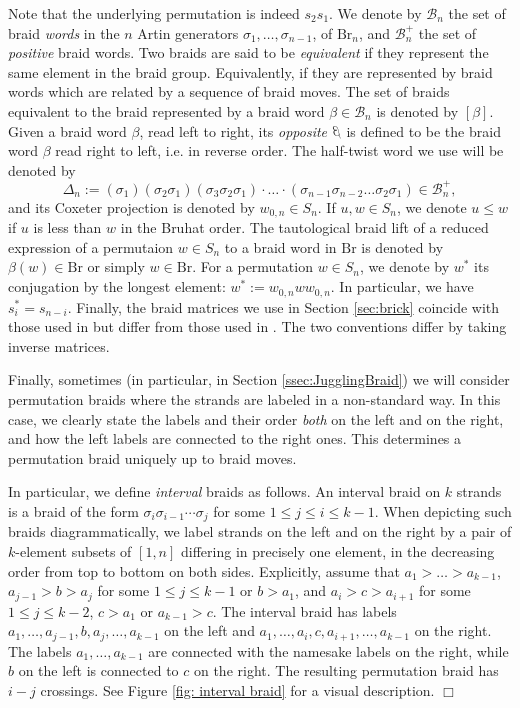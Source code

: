 \documentclass[10pt]{amsart}
\theoremstyle{plain}
\theoremstyle{definition}
\theoremstyle{remark}
\numberwithin{equation}{section}
\newcommand{\cB}{\mathcal{B}}
\newcommand{\Br}{\mathrm{Br}}
\DeclareRobustCommand{\ateb}{\text{\reflectbox{$\beta$}}}
\begin{document}
\noindent Note that the underlying permutation is indeed $s_2s_1$. We denote by $\cB_n$ the set of braid {\it words} in the $n$ Artin generators $\sigma_1,\ldots,\sigma_{n-1}$, of $\Br_n$, and $\cB^+_n$ the set of {\it positive} braid words. Two braids are said to be \emph{equivalent} if they represent the same element in the braid group. Equivalently, if they are represented by braid words which are related by a sequence of braid moves. The set of braids equivalent to the braid represented by a braid word $\beta\in\cB_n$ is denoted by $[\beta]$. Given a braid word $\beta$, read left to right, its {\it opposite} $\ateb$ is defined to be the braid word $\beta$ read right to left, i.e. in reverse order. The half-twist word we use will be denoted by
$$\Delta_n:=(\sigma_1)(\sigma_2\sigma_1)(\sigma_3\sigma_2\sigma_1)\cdot\ldots\cdot(\sigma_{n-1}\sigma_{n-2}\ldots\sigma_2\sigma_1)\in\cB^+_n,$$
and its Coxeter projection is denoted by $w_{0,n}\in S_n$. If $u,w\in S_n$, we denote $u\leq w$ if $u$ is less than $w$ in the Bruhat order. The tautological braid lift of a reduced expression of a permutaion $w\in S_n$ to a braid word in $\Br$ is denoted by $\beta(w)\in \Br$ or simply $w\in \Br$. 
For a permutation $w \in S_n$, we denote by $w^*$ its conjugation by the longest element: $w^* := w_{0, n} w w_{0, n}$. In particular, we have $s_i^* = s_{n-i}$.
Finally, the braid matrices we use in Section \ref{sec:brick} coincide with those used in \cite{CGGS, CasalsNg} but differ from those used in \cite{cgglss}. The two conventions differ by taking inverse matrices. 

Finally, sometimes (in particular, in Section \ref{ssec:JugglingBraid}) we will consider  permutation braids where the strands are labeled in a non-standard way. In this case, we clearly state the labels and their order {\it both} on the left and on the right, and how the left labels are connected to the right ones. This determines a permutation braid uniquely up to braid moves. 

In particular, we define {\it interval} braids as follows.
An interval braid on $k$ strands is a braid of the form $\sigma_i\sigma_{i-1}\cdots \sigma_{j}$ for some $1 \leq j \leq i \leq k - 1$. When depicting such braids diagrammatically, we label strands on the left and on the right by a pair of $k$-element subsets of $[1,n]$ differing in precisely one element, in the decreasing order from top to bottom on both sides. 
Explicitly, assume that $a_1>\ldots>a_{k-1}$, $a_{j-1}>b>a_j$ for some $1 \leq j \leq k-1$ or $b > a_1$, and $a_i>c>a_{i+1}$ for some $1 \leq j \leq k-2$, $c >a_1$ or $a_{k-1} > c$. 
The interval braid has labels $a_1,\ldots,a_{j-1},b,a_j,\ldots,a_{k-1}$ on the left and $a_1,\ldots,a_i,c,a_{i+1},\ldots,a_{k-1}$ on the right. The labels $a_1,\ldots,a_{k-1}$ are connected with the namesake labels on the right, while $b$ on the left is connected to $c$ on the right. The resulting permutation braid has $i-j$ crossings. See Figure \ref{fig: interval braid} for a visual description. 
\hfill$\Box$
\end{document}
